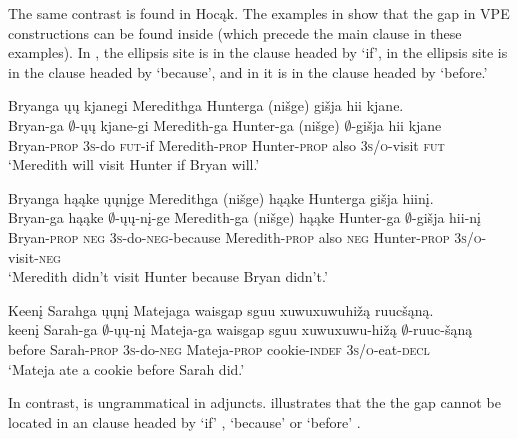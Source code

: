 \documentclass[output=paper]{LSP/langsci}
\begin{document}
 
The same contrast is found in Hocąk. The examples in  show that the gap in VPE constructions can be found inside   (which precede the main clause in these examples). In , the ellipsis site is in the clause headed by `if', in  the ellipsis site is in the clause headed by `because', and in  it is in the clause headed by `before.'
 
 
\ea\label{ex:johnson:35}
\ea\label{ex:johnson:35a} 
\glll Bryanga ųų kjanegi Meredithga Hunterga (nišge) {gišja hii} kjane.\\
Bryan-ga $\emptyset$-ųų kjane-gi Meredith-ga Hunter-ga (nišge) $\emptyset$-{gišja hii} kjane\\
Bryan-\textsc{prop} \textsc{3s}-do \textsc{fut}-if Meredith-\textsc{prop} Hunter-\textsc{prop} also \textsc{3s/o}-visit \textsc{fut}\\
\trans `Meredith will visit Hunter if Bryan will.'
 
\ex\label{ex:johnson:35b} 
\glll Bryanga hąąke ųųnįge Meredithga (nišge) hąąke Hunterga {gišja hiinį}.\\
Bryan-ga hąąke $\emptyset$-ųų-nį-ge Meredith-ga (nišge) hąąke Hunter-ga $\emptyset$-{gišja hii-nį}\\
Bryan-\textsc{prop} \textsc{neg} \textsc{3s}-do-\textsc{neg}-because Meredith-\textsc{prop} also \textsc{neg} Hunter-\textsc{prop} \textsc{3s/o}-visit-\textsc{neg}\\
\trans `Meredith didn't visit Hunter because Bryan didn't.'
 
\ex\label{ex:johnson:35c} 
\glll Keenį Sarahga ųųnį Matejaga {waisgap sguu xuwuxuwuhižą} ruucšąną.\\
keenį Sarah-ga $\emptyset$-ųų-nį Mateja-ga {waisgap sguu xuwuxuwu-hižą} $\emptyset$-ruuc-šąną\\
before Sarah-\textsc{prop} \textsc{3s}-do-\textsc{neg} Mateja-\textsc{prop} cookie-\textsc{indef} \textsc{3s/o}-eat-\textsc{decl}\\
\trans `Mateja ate a cookie before Sarah did.'
\z
\z

In contrast,  is ungrammatical in adjuncts.  illustrates that the the gap cannot be located in an  clause headed by `if' , `because'  or `before' .
\end{document}
